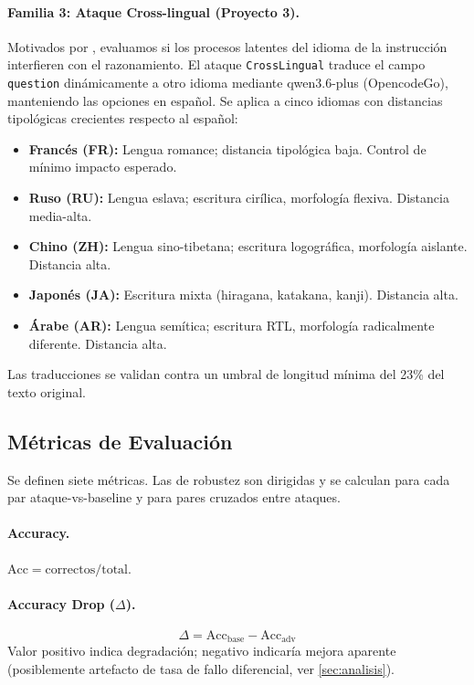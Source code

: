 \documentclass[11pt]{article}
\begin{document}
\paragraph{Familia 3: Ataque Cross-lingual (Proyecto 3).}
 
Motivados por \citet{languagespecific2025}, evaluamos si los procesos
latentes del idioma de la instrucción interfieren con el razonamiento.
El ataque \texttt{CrossLingual} traduce el campo \texttt{question}
dinámicamente a otro idioma mediante qwen3.6-plus (OpencodeGo),
manteniendo las opciones en español. Se aplica a cinco idiomas con
distancias tipológicas crecientes respecto al español:
 
\begin{itemize}
  \item \textbf{Francés (FR):} Lengua romance; distancia tipológica
  baja. Control de mínimo impacto esperado.
  \item \textbf{Ruso (RU):} Lengua eslava; escritura cirílica,
  morfología flexiva. Distancia media-alta.
  \item \textbf{Chino (ZH):} Lengua sino-tibetana; escritura
  logográfica, morfología aislante. Distancia alta.
  \item \textbf{Japonés (JA):} Escritura mixta (hiragana, katakana,
  kanji). Distancia alta.
  \item \textbf{Árabe (AR):} Lengua semítica; escritura RTL, morfología
  radicalmente diferente. Distancia alta.
\end{itemize}
 
Las traducciones se validan contra un umbral de longitud mínima del
23\% del texto original.

\subsection{Métricas de Evaluación}
 
Se definen siete métricas. Las de robustez son dirigidas y se calculan
para cada par ataque-vs-baseline y para pares cruzados entre ataques.
 
\paragraph{Accuracy.}
$\text{Acc} = \text{correctos} / \text{total}$.
 
\paragraph{Accuracy Drop ($\Delta$).}
\begin{equation}
  \Delta = \text{Acc}_{\text{base}} - \text{Acc}_{\text{adv}}
\end{equation}
Valor positivo indica degradación; negativo indicaría mejora aparente
(posiblemente artefacto de tasa de fallo diferencial, ver \ref{sec:analisis}).
 
\end{document}
